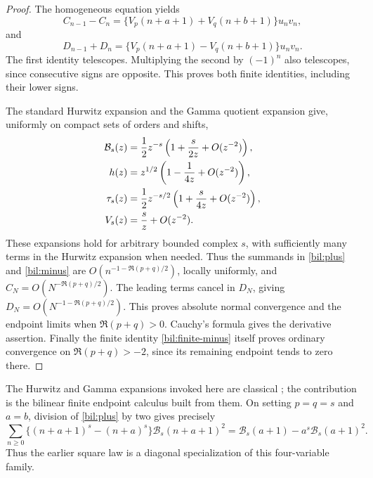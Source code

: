 \begin{proof}
The homogeneous equation yields
\[
 C_{n-1}-C_n=\{V_p(n+a+1)+V_q(n+b+1)\}u_nv_n,
\]
and
\[
 D_{n-1}+D_n=\{V_p(n+a+1)-V_q(n+b+1)\}u_nv_n.
\]
The first identity telescopes. Multiplying the second by $(-1)^n$
also telescopes, since consecutive signs are opposite. This proves
both finite identities, including their lower signs.

The standard Hurwitz expansion and the Gamma quotient expansion give,
uniformly on compact sets of orders and shifts,
\begin{align}
 \mathcal B_s(z)&=\frac12z^{-s}
                       \left(1+\frac{s}{2z}+O(z^{-2})\right),\notag\\
 h(z)&=z^{1/2}\left(1-\frac1{4z}+O(z^{-2})\right),\notag\\
 \tau_s(z)&=\frac12z^{-s/2}
                       \left(1+\frac{s}{4z}+O(z^{-2})\right),
                         \label{bil:asymptotics}\\
 V_s(z)&=\frac{s}{z}+O(z^{-2}).\notag
\end{align}
These expansions hold for arbitrary bounded complex $s$, with
sufficiently many terms in the Hurwitz expansion when needed. Thus
the summands in \eqref{bil:plus} and \eqref{bil:minus} are
$O(n^{-1-\Re(p+q)/2})$, locally uniformly, and
$C_N=O(N^{-\Re(p+q)/2})$. The leading terms cancel in $D_N$, giving
$D_N=O(N^{-1-\Re(p+q)/2})$. This proves absolute normal convergence
and the endpoint limits when $\Re(p+q)>0$. Cauchy's formula gives
the derivative assertion. Finally the finite identity
\eqref{bil:finite-minus} itself proves ordinary convergence on
$\Re(p+q)>-2$, since its remaining endpoint tends to zero there.
\end{proof}

The Hurwitz and Gamma expansions invoked here are classical
\cite{bil:DLMF}; the contribution is the bilinear finite endpoint
calculus built from them. On setting $p=q=s$ and $a=b$, division
of \eqref{bil:plus} by two gives precisely
\[
 \sum_{n\ge0}\{(n+a+1)^s-(n+a)^s\}\mathcal B_s(n+a+1)^2
 =\mathcal B_s(a+1)-a^s\mathcal B_s(a+1)^2.
\]
Thus the earlier square law is a diagonal specialization of this
four-variable family.

